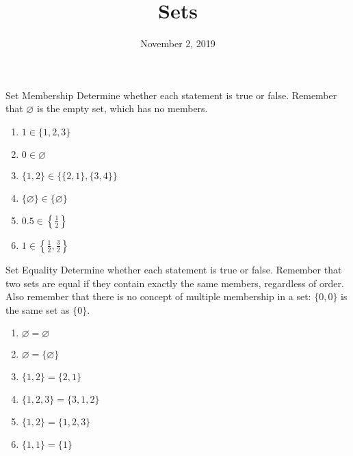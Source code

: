 \documentclass[12pt,letterpaper]{article}
\title{Sets}
\date{November 2, 2019}
\begin{document}
\maketitle

\thispagestyle{empty}


\begin{problem}{Set Membership}
  Determine whether each statement is true or false. Remember that $\varnothing$ is the
  empty set, which has no members.

  \begin{multicols}{2}
  \begin{enumerate}[\hspace{.5cm}a.]
    \item \( 1 \in \{1, 2, 3\} \) \hfill \TFTrue
    \item \( 0 \in \varnothing \) \hfill \TFFalse
    \item \( \{1, 2\} \in \{\{2, 1\}, \{3, 4\}\} \) \hfill \TFTrue
    \item \( \{\varnothing\} \in \{\varnothing\} \) \hfill \TFFalse
    \item \( 0.5 \in \left\{\frac{1}{2}\right\} \) \hfill \TFTrue
    \item \( 1 \in \left\{\frac{1}{2}, \frac{3}{2}\right\} \) \hfill \TFFalse
  \end{enumerate}
  \end{multicols}
\end{problem}

\begin{problem}{Set Equality}
  Determine whether each statement is true or false. Remember that two sets are equal if
  they contain exactly the same members, regardless of order. Also remember that there is no
  concept of multiple membership in a set: \(\{0, 0\}\) is the same set as \(\{0\}\).

  \begin{multicols}{2}
  \begin{enumerate}[\hspace{.5cm}a.]
    \item \( \varnothing = \varnothing \) \hfill \TFTrue
    \item \( \varnothing = \{\varnothing\} \) \hfill \TFFalse
    \item \( \{1, 2\} = \{2, 1\} \) \hfill \TFTrue
    \item \( \{1, 2, 3\} = \{3, 1, 2\} \) \hfill \TFTrue
    \item \( \{1, 2\} = \{1, 2, 3\} \) \hfill \TFFalse
    \item \( \{1, 1\} = \{1\} \) \hfill \TFTrue
  \end{enumerate}
  \end{multicols}
\end{problem}
\end{document}
